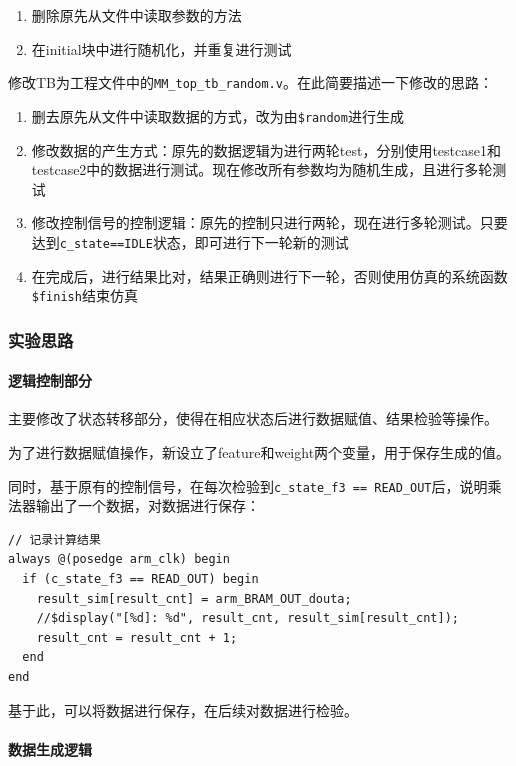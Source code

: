 \documentclass[12pt,a4paper]{article}
\begin{document}
\begin{enumerate}
\item
  删除原先从文件中读取参数的方法
\item
  在initial块中进行随机化，并重复进行测试
\end{enumerate}

修改TB为工程文件中的\texttt{MM\_top\_tb\_random.v}。在此简要描述一下修改的思路：

\begin{enumerate}
\item
  删去原先从文件中读取数据的方式，改为由\texttt{\$random}进行生成
\item
  修改数据的产生方式：原先的数据逻辑为进行两轮test，分别使用testcase1和testcase2中的数据进行测试。现在修改所有参数均为随机生成，且进行多轮测试
\item
  修改控制信号的控制逻辑：原先的控制只进行两轮，现在进行多轮测试。只要达到\texttt{c\_state==IDLE}状态，即可进行下一轮新的测试
\item
  在完成后，进行结果比对，结果正确则进行下一轮，否则使用仿真的系统函数\texttt{\$finish}结束仿真
\end{enumerate}

\subsubsection{实验思路}

\paragraph{逻辑控制部分}

主要修改了状态转移部分，使得在相应状态后进行数据赋值、结果检验等操作。

为了进行数据赋值操作，新设立了feature和weight两个变量，用于保存生成的值。

同时，基于原有的控制信号，在每次检验到\texttt{c\_state\_f3\ ==\ READ\_OUT}后，说明乘法器输出了一个数据，对数据进行保存：

\begin{lstlisting}
// 记录计算结果
always @(posedge arm_clk) begin
  if (c_state_f3 == READ_OUT) begin
    result_sim[result_cnt] = arm_BRAM_OUT_douta;
    //$display("[%d]: %d", result_cnt, result_sim[result_cnt]);
    result_cnt = result_cnt + 1;
  end
end
\end{lstlisting}

基于此，可以将数据进行保存，在后续对数据进行检验。

\paragraph{数据生成逻辑}
\end{document}
